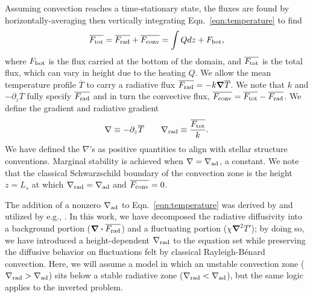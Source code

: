 \documentclass[twocolumn]{aastex631}
\newcommand{\gradrad}{\ensuremath{\nabla_{\rm{rad}}}}
\newcommand{\gradad}{\ensuremath{\nabla_{\rm{ad}}}}
\newcommand{\justgrad}{\ensuremath{\nabla}}
\newcommand{\Fbot}{\ensuremath{F_{\rm{bot}}}}
\newcommand{\Ftot}{\ensuremath{F_{\rm{tot}}}}
\newcommand{\Frad}{\ensuremath{F_{\rm{rad}}}}
\newcommand{\Fconv}{\ensuremath{F_{\rm{conv}}}}
\renewcommand{\vec}[1]{\boldsymbol{#1}}
\renewcommand{\dot}{\vec{\cdot}}
\renewcommand{\bar}[1]{\overline{#1}}
\newcommand{\grad}{\vec{\nabla}}
\begin{document}
Assuming convection reaches a time-stationary state, the fluxes are found by horizontally-averaging then vertically integrating Eqn.~\ref{eqn:temperature} to find
\begin{equation}
\overline{\Ftot} = \overline{\Frad} + \overline{\Fconv} = \int Q dz + \Fbot,
\label{eqn:flux_definition}
\end{equation}
where $\Fbot$ is the flux carried at the bottom of the domain, and $\overline{\Ftot}$ is the total flux, which can vary in height due to the heating $Q$.
We allow the mean temperature profile $\overline{T}$ to carry a radiative flux $\bar{\Frad} = -k \grad \overline{T}$.
We note that $k$ and $-\partial_z \bar{T}$ fully specify $\bar{\Frad}$ and in turn the convective flux, $\bar{\Fconv} = \bar{\Ftot} - \bar{\Frad}$.
We define the gradient and radiative gradient 
\begin{equation}
\justgrad \equiv -\partial_z \bar{T} \qquad
\gradrad \equiv \frac{\bar{\Ftot}}{k}.
\label{eqn:gradrad_definition}
\end{equation}
We have defined the $\justgrad$'s as positive quantities to align with stellar structure conventions.
Marginal stability is achieved when $\justgrad = \gradad$, a constant.
We note that the classical Schwarzschild boundary of the convection zone is the height $z = L_s$ at which $\gradrad = \gradad$ and $\bar{\Fconv} = 0$.

The addition of a nonzero $\gradad$ to Eqn.~\ref{eqn:temperature} was derived by \citet{spiegel_veronis_1960} and utilized by e.g., \citet{korre_etal_2019}.
In this work, we have decomposed the radiative diffusivity into a background portion ($\grad\dot \bar{\Frad}$) and a fluctuating portion ($\chi \grad^2 T'$); by doing so, we have introduced a height-dependent $\gradrad$ to the equation set while preserving the diffusive behavior on fluctuations felt by classical Rayleigh-B\'{e}nard convection.
Here, we will assume a model in which an unstable convection zone ($\gradrad > \gradad$) sits below a stable radiative zone ($\gradrad < \gradad$), but the same logic applies to the inverted problem.
\end{document}
